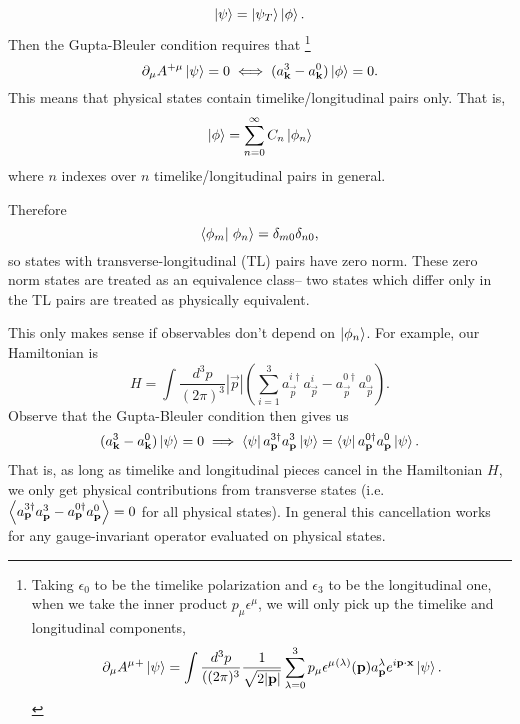 $$\left| \psi \right>=\left| \psi_T \right>\left| \phi \right>.$$
Then the Gupta-Bleuler condition requires that%
    \footnote{Taking $\epsilon_0$ to be the timelike polarization and $\epsilon_3$ to be the longitudinal one, when we take the inner product $p_\mu \epsilon^\mu$, we will only pick up the timelike and longitudinal components,
    \begin{equation*}
        \partial_\mu A^\mu{}^+\left| \psi \right> = \int \frac{d^3p}{((2\pi)^3} \frac{1}{\sqrt{2|\boldsymbol{\mathbf{p}}|}} \sum_{\lambda=0}^3 p_\mu \epsilon^\mu{}^{(\lambda)}(\boldsymbol{\mathbf{p}}) a_{\boldsymbol{\mathbf{p}}}^\lambda e^{i\boldsymbol{\mathbf{p}} \cdot \boldsymbol{\mathbf{x}}}\left| \psi \right>.
    \end{equation*}
    }
$$\partial_\mu A^{+\mu}\left| \psi \right>=0 \iff (a_{\boldsymbol{\mathbf{k}}}^3- a_{\boldsymbol{\mathbf{k}}}^0)\left| \phi \right>=0.$$
This means that physical states contain timelike/longitudinal pairs only. That is,
$$\left| \phi \right>=\sum_{n=0}^\infty C_n \left| \phi_n \right>$$
where $n$ indexes over $n$ timelike/longitudinal pairs in general.%

Therefore
$$\braket{\phi_m}{\phi_n}=\delta_{m0}\delta_{n0},$$ so states with transverse-longitudinal (TL) pairs have zero norm. These zero norm states are treated as an equivalence class-- two states which differ only in the TL pairs are treated as physically equivalent.

This only makes sense if observables don't depend on $\left| \phi_n \right>$. For example, our Hamiltonian is
$$H=\int \frac{d^3p}{(2\pi)^3} |\vec p| \left(\sum_{i=1}^3 a_{\vec p}^{i\dagger} a_{\vec p}^i - a_{\vec p}^{0\dagger} a_{\vec p}^0\right).$$
Observe that the Gupta-Bleuler condition then gives us
$$(a_{\boldsymbol{\mathbf{k}}}^3 -a_{\boldsymbol{\mathbf{k}}}^0)\left| \psi \right>=0 \implies \left< \psi \right| a_{\boldsymbol{\mathbf{p}}}^{3\dagger} a_{\boldsymbol{\mathbf{p}}}^3 \left| \psi \right>=\left< \psi \right| a_{\boldsymbol{\mathbf{p}}}^{0\dagger} a_{\boldsymbol{\mathbf{p}}}^0 \left| \psi \right>.$$
That is, as long as timelike and longitudinal pieces cancel in the Hamiltonian $H$, we only get physical contributions from transverse states (i.e. $\left< a_{\boldsymbol{\mathbf{p}}}^{3\dagger} a_{\boldsymbol{\mathbf{p}}}^3 -a_{\boldsymbol{\mathbf{p}}}^{0\dagger} a_{\boldsymbol{\mathbf{p}}}^0 \right> =0$ for all physical states).
In general this cancellation works for any gauge-invariant operator evaluated on physical states.


